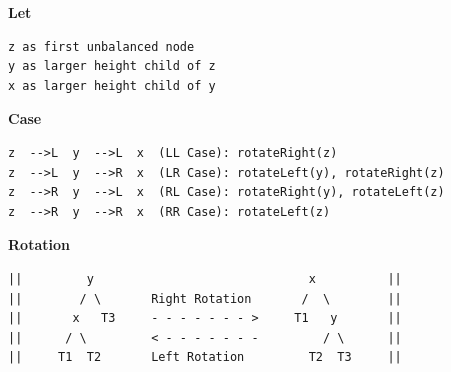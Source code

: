 \textbf{Let}
\begin{verbatim}
z as first unbalanced node
y as larger height child of z
x as larger height child of y
\end{verbatim}

\textbf{Case}
\begin{verbatim}
z  -->L  y  -->L  x  (LL Case): rotateRight(z)
z  -->L  y  -->R  x  (LR Case): rotateLeft(y), rotateRight(z)
z  -->R  y  -->L  x  (RL Case): rotateRight(y), rotateLeft(z)
z  -->R  y  -->R  x  (RR Case): rotateLeft(z)
\end{verbatim}

\textbf{Rotation}
\begin{verbatim}
||         y                              x          ||
||        / \       Right Rotation       /  \        ||
||       x   T3     - - - - - - - >     T1   y       ||
||      / \         < - - - - - - -         / \      ||
||     T1  T2       Left Rotation         T2  T3     ||
\end{verbatim}
